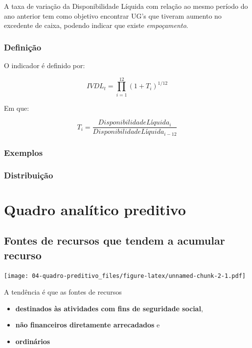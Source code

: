 \documentclass[
]{book}
\providecommand{\tightlist}{%
  \setlength{\itemsep}{0pt}\setlength{\parskip}{0pt}}
\begin{document}
A taxa de variação da Disponibilidade Líquida com relação ao mesmo período do ano anterior tem como objetivo encontrar UG's que tiveram aumento no excedente de caixa, podendo indicar que existe \emph{empoçamento}.

\hypertarget{definiuxe7uxe3o-5}{%
\subsection{Definição}\label{definiuxe7uxe3o-5}}

O indicador é definido por:

\[IVDL_t = \prod_{i=1}^{12}(1 + T_i)^{1/12}\]

Em que:

\[T_i = \frac{DisponibilidadeLíquida_i}{DisponibilidadeLíquida_{i-12}}\]

\hypertarget{exemplos-4}{%
\subsection{Exemplos}\label{exemplos-4}}

\hypertarget{distribuiuxe7uxe3o-3}{%
\subsection{Distribuição}\label{distribuiuxe7uxe3o-3}}

\hypertarget{quadro-analuxedtico-preditivo}{%
\chapter{Quadro analítico preditivo}\label{quadro-analuxedtico-preditivo}}

\hypertarget{fontes-de-recursos-que-tendem-a-acumular-recurso}{%
\section{Fontes de recursos que tendem a acumular recurso}\label{fontes-de-recursos-que-tendem-a-acumular-recurso}}

\texttt{[image: 04-quadro-preditivo\_files/figure-latex/unnamed-chunk-2-1.pdf]}

A tendência é que as fontes de recursos

\begin{itemize}
\tightlist
\item
  \textbf{destinados às atividades com fins de seguridade social},
\item
  \textbf{não financeiros diretamente arrecadados} e
\item
  \textbf{ordinários}
\end{itemize}
\end{document}
